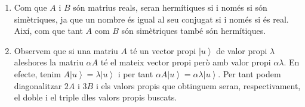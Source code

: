 \documentclass[12pt]{article}
\numberwithin{table}{section}
\numberwithin{figure}{section}
\numberwithin{equation}{section}
\newcommand{\ket}[1]{\left\lvert #1 \right\rangle}
\begin{document}
\begin{enumerate}[label=(\alph*), font=\bfseries \sffamily, wide, labelwidth=!, labelindent=0pt]
	\item Com que \( A \) i \( B \) són matrius reals, seran hermítiques si i només si són simètriques, ja que un nombre és igual al seu conjugat si i només si és real. Així, com que tant \( A \) com \( B \) són simètriques també són hermítiques. 
	\item Observem que si una matriu \( A \) té un vector propi \( \ket{u} \) de valor propi \( \lambda \) aleshores la matriu \( \alpha A \) té el mateix vector propi però amb valor propi \( \alpha \lambda \). En efecte, tenim \( A \ket{u} = \lambda\ket{u} \) i per tant \( \alpha A\ket{u} = \alpha\lambda\ket{u} \). Per tant podem diagonalitzar \( 2A \) i \( 3B \) i els valors propis que obtinguem seran, respectivament, el doble i el triple dles valors propis buscats. 


\end{enumerate}
\end{document}
